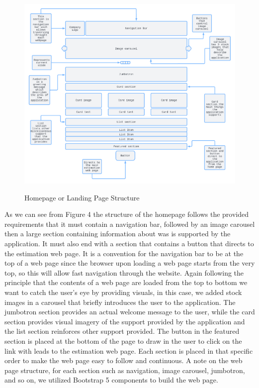 \documentclass[12pt]{article}
\begin{document}
\begin{figure}[H]
\caption{Homepage or Landing Page Structure}
\centering
\includegraphics[scale=.26]{figures/Homepage Mockup.png}\\
\end{figure}
\noindent As we can see from Figure 4 the structure of the homepage follows the provided requirements that it must contain a navigation bar, followed by an image carousel then a large section containing information about was is supported by the application. It must also end with a section that contains a button that directs to the estimation web page. It is a convention for the navigation bar to be at the top of a web page since the browser upon loading a web page starts from the very top, so this will allow fast navigation through the website. Again following the principle that the contents of a web page are loaded from the top to bottom we want to catch the user's eye by providing visuals, in this case, we added stock images in a carousel that briefly introduces the user to the application. The jumbotron section provides an actual welcome message to the user, while the card section provides visual imagery of the support provided by the application and the list section reinforces other support provided. The button in the featured section is placed at the bottom of the page to draw in the user to click on the link with leads to the estimation web page. Each section is placed in that specific order to make the web page easy to follow and continuous. A note on the web page structure, for each section such as navigation, image carousel, jumbotron, and so on, we utilized Bootstrap 5 components to build the web page. 
\end{document}
